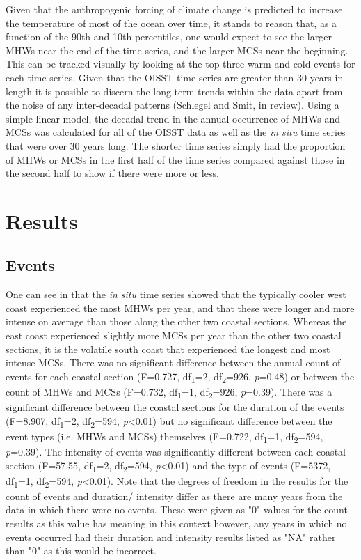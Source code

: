 \documentclass[a4paper,10pt,review]{elsarticle}
\begin{document}
Given that the anthropogenic forcing of climate change is predicted to increase the temperature of most of the ocean over time, it stands to reason that, as a function of the 90th and 10th percentiles, one would expect to see the larger MHWs near the end of the time series, and the larger MCSs near the beginning. This can be tracked visually by looking at the top three warm and cold events for each time series. Given that the OISST time series are greater than 30 years in length it is possible to discern the long term trends within the data apart from the noise of any inter-decadal patterns (Schlegel and Smit, in review). Using a simple linear model, the decadal trend in the annual occurrence of MHWs and MCSs was calculated for all of the OISST data as well as the \emph{in situ} time series that were over 30 years long. The shorter time series simply had the proportion of MHWs or MCSs in the first half of the time series compared against those in the second half to show if there were more or less.

\section{Results}

\subsection{Events}
One can see in  that the \emph{in situ} time series showed that the typically cooler west coast experienced the most MHWs per year, and that these were longer and more intense on average than those along the other two coastal sections. Whereas the east coast experienced slightly more MCSs per year than the other two coastal sections, it is the volatile south coast that experienced the longest and most intense MCSs. There was no significant difference between the annual count of events for each coastal section (F=0.727, df\textsubscript{1}=2, df\textsubscript{2}=926, \emph{p}=0.48) or between the count of MHWs and MCSs (F=0.732, df\textsubscript{1}=1, df\textsubscript{2}=926, \emph{p}=0.39). There was a significant difference between the coastal sections for the duration of the events (F=8.907, df\textsubscript{1}=2, df\textsubscript{2}=594, \emph{p}<0.01) but no significant difference between the event types (i.e. MHWs and MCSs) themselves (F=0.722, df\textsubscript{1}=1, df\textsubscript{2}=594, \emph{p}=0.39). The intensity of events was significantly different between each coastal section (F=57.55, df\textsubscript{1}=2, df\textsubscript{2}=594, \emph{p}<0.01) and the type of events (F=5372, df\textsubscript{1}=1, df\textsubscript{2}=594, \emph{p}<0.01). Note that the degrees of freedom in the results for the count of events and duration/ intensity differ as there are many years from the data in which there were no events. These were given as "0" values for the count results as this value has meaning in this context however, any years in which no events occurred had their duration and intensity results listed as "NA" rather than "0" as this would be incorrect.
\end{document}

